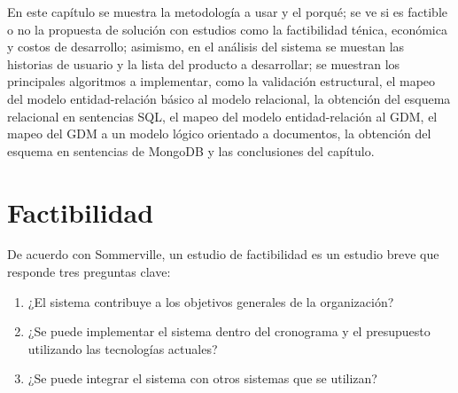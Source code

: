 





En este capítulo se muestra la metodología a usar y el porqué; se ve si es factible o no la propuesta de solución con estudios como la factibilidad ténica, económica y costos de desarrollo; asimismo, en el análisis del sistema se muestan las historias de usuario y la lista del producto a desarrollar; se muestran los principales algoritmos a implementar, como la validación estructural, el mapeo del modelo entidad-relación básico al modelo relacional, la obtención del esquema relacional en sentencias SQL, el mapeo del modelo entidad-relación al GDM, el mapeo del GDM a un modelo lógico orientado a documentos, la obtención del esquema en sentencias de MongoDB y las conclusiones del capítulo.



\section{Factibilidad}\label{ref:sec-factibilidad}

De acuerdo con Sommerville\cite{sommerville_software_2011}, un estudio de factibilidad es un estudio breve que responde tres preguntas clave:

\begin{enumerate}
    \item ¿El sistema contribuye a los objetivos generales de la organización? 
    \item ¿Se puede implementar el sistema dentro del cronograma y el presupuesto utilizando las tecnologías actuales? 
    \item ¿Se puede integrar el sistema con otros sistemas que se utilizan? 
\end{enumerate}


